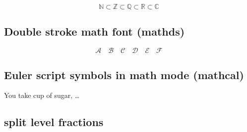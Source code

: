 %
\begin{filecontents*}{\democodefile}
\[
\mathds{N}\subset\mathds{Z}
          \subset\mathds{Q}
          \subset\mathds{R}
          \subset\mathds{C}
\]
\end{filecontents*}

\subsection{Double stroke math font (mathds)}

%
\begin{filecontents*}{\democodefile}
\[
  \mathcal{A} \quad \mathcal{B} \quad 
  \mathcal{C} \quad \mathcal{D} \quad 
  \mathcal{E} \quad \mathcal{F}
\]
\end{filecontents*}

\subsection{Euler script symbols in math mode (mathcal)}

%
\begin{filecontents*}{\democodefile}
You take  cup of sugar, \ldots
\end{filecontents*}

\subsection{split level fractions}

%

\clearpage
